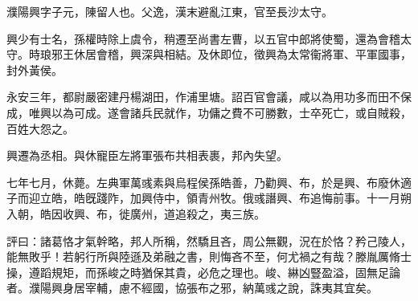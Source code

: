 \begin{pinyinscope}
 
 
 濮陽興字子元，陳留人也。父逸，漢末避亂江東，官至長沙太守。
 
 
 興少有士名，孫權時除上虞令，稍遷至尚書左曹，以五官中郎將使蜀，還為會稽太守。時琅邪王休居會稽，興深與相結。及休即位，徵興為太常衞將軍、平軍國事，封外黃侯。
 
 
 
 
 永安三年，都尉嚴密建丹楊湖田，作浦里塘。詔百官會議，咸以為用功多而田不保成，唯興以為可成。遂會諸兵民就作，功傭之費不可勝數，士卒死亡，或自賊殺，百姓大怨之。
 
 
 
 
 興遷為丞相。與休寵臣左將軍張布共相表裹，邦內失望。
 
 
 
 
 七年七月，休薨。左典軍萬彧素與烏程侯孫皓善，乃勸興、布，於是興、布廢休適子而迎立皓，皓旣踐阼，加興侍中，領青州牧。俄彧譖興、布追悔前事。十一月朔入朝，皓因收興、布，徙廣州，道追殺之，夷三族。
 
 
 
 
 評曰：諸葛恪才氣幹略，邦人所稱，然驕且吝，周公無觀，況在於恪？矜己陵人，能無敗乎！若躬行所與陸遜及弟融之書，則悔吝不至，何尤禍之有哉？滕胤厲脩士操，遵蹈規矩，而孫峻之時猶保其貴，必危之理也。峻、綝凶豎盈溢，固無足論者。濮陽興身居宰輔，慮不經國，協張布之邪，納萬彧之說，誅夷其宜矣。
 
 
\end{pinyinscope}